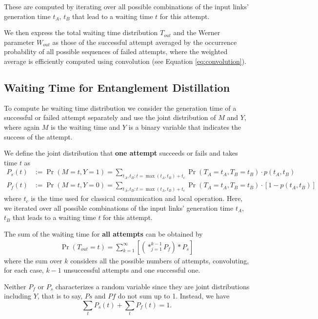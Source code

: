 \documentclass{masterthesis}
\begin{document}
These are computed by iterating over all possible combinations of the input links' generation time $t_A$, $t_B$ that lead to a waiting time $t$ for this attempt.

We then express the total waiting time distribution $T_{out}$ and the Werner parameter $W_{out}$ as those of the successful attempt averaged by the occurrence probability of all possible sequences of failed attempts, where the weighted average is efficiently computed using convolution (see Equation \ref{eq:convolution}). %

\subsection*{Waiting Time for Entanglement Distillation}

To compute he waiting time distribution we consider the generation time of a successful or failed attempt separately and use the joint distribution of $M$ and $Y$, where again $M$ is the waiting time and $Y$ is a binary variable that indicates the success of the attempt. %

We define the joint distribution that \textbf{one attempt} succeeds or fails and takes time $t$ as %
\begin{align}
    P_s(t) &:= \Pr(M = t, Y = 1) = \sum_{t_A, t_B : t = \max(t_A, t_B) + t_c} \Pr(T_A = t_A, T_B = t_B) \cdot p(t_A, t_B) \\
    P_f(t) &:= \Pr(M = t, Y = 0) = \sum_{t_A, t_B : t = \max(t_A, t_B) + t_c} \Pr(T_A = t_A, T_B = t_B) \cdot [1 - p(t_A, t_B)]
\end{align}
where $t_c$ is the time used for classical communication and local operation. Here, we iterated over all possible combinations of the input links' generation time $t_A$, $t_B$ that leads to a waiting time $t$ for this attempt.

The sum of the waiting time for \textbf{all attempts} can be obtained by
\begin{align}\label{eq:waiting_time_distillation}
    \Pr(T_{out} = t) = \sum_{k=1}^{\infty} \left[ \left( \ast_{j=1}^{k-1} P_f \right) \ast P_s \right]
\end{align}
where the sum over $k$ considers all the possible numbers of attempts, convoluting, for each case, $k-1$ unsuccessful attempts and one successful one.

Neither $P_f$ or $P_s$ characterizes a random variable since they are joint distributions including $Y$, that is to say, $Ps$ and $Pf$ do not sum up to 1. Instead, we have
\begin{equation}
    \sum_t P_s(t) + \sum_t P_f(t) = 1 .
\end{equation}
\end{document}
